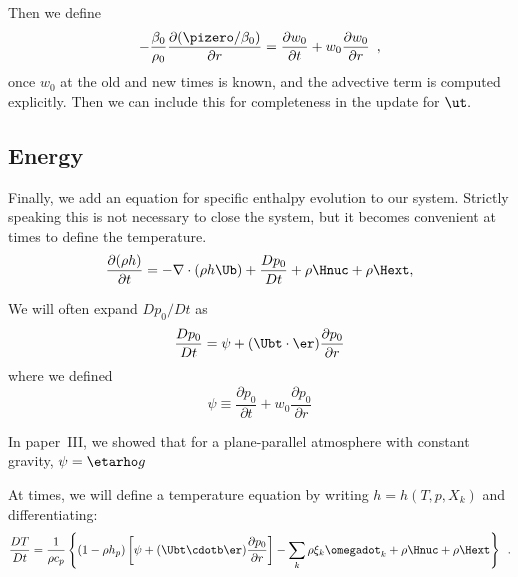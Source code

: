Then we define 
\begin{equation}
- \frac{\beta_0}{\rho_0} \frac{\partial (\pizero/\beta_0)}{\partial r} = \frac{\partial w_0}{\partial t} + 
   w_0 \frac{\partial w_0}{\partial r} \enskip, \label{eq:pizero}
\end{equation}
once $w_0$ at the old and new times is known, and the advective term is computed explicitly.
Then we can include this for completeness in the update for $\ut.$




\subsection{Energy}

Finally, we add an equation for specific enthalpy evolution to our
system.  Strictly speaking this is not necessary to close the system,
but it becomes convenient at times to define the temperature.
\begin{equation}
\frac{\partial(\rho h)}{\partial t} = 
   -\nabla\cdot(\rho h\Ub) + \frac{Dp_0}{Dt} + \rho\Hnuc + \rho\Hext,\label{eq:flow:enthalpy}
\end{equation}

We will often expand $Dp_0/Dt$ as
\begin{equation}
\frac{Dp_0}{Dt} = \psi + (\Ubt \cdot \er) \frac{\partial p_0}{\partial r}
\end{equation}
where we defined
\begin{equation}
\psi \equiv \frac{\partial p_0}{\partial t} + w_0 \frac{\partial p_0}{\partial r}
\end{equation}

In paper~III, we showed that for a plane-parallel atmosphere with constant gravity,
$\psi = \etarho g$


At times, we will define a temperature equation by writing $h = h(T,p,X_k)$
and differentiating:
\begin{equation}
\label{eq:flow:temp}
\frac{DT}{Dt} = \frac{1}{\rho c_p} \left\{ \left(1 - \rho h_p\right) \left 
  [ \psi + (\Ubt \cdotb \er) \frac{\partial p_0}{\partial r} \right ]
 - \sum_k \rho \xi_k {\omegadot}_k
 + \rho \Hnuc + \rho \Hext \right \} \enskip  .
\end{equation}

